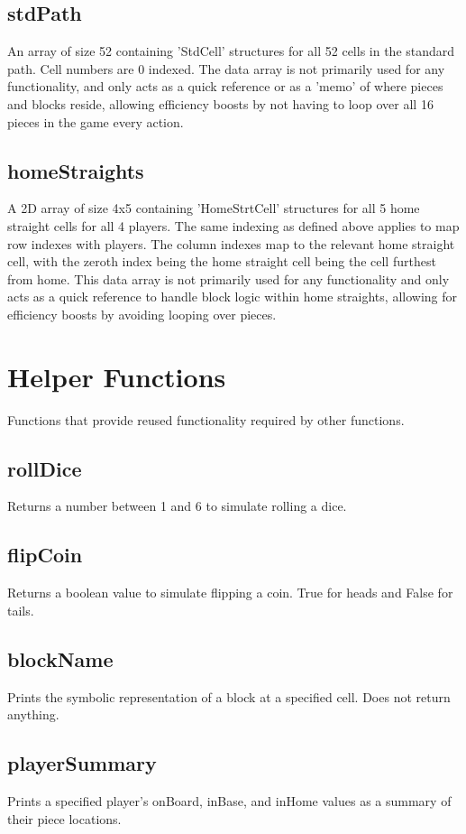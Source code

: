 \documentclass{article}
\begin{document}
\subsection{stdPath}
An array of size 52 containing 'StdCell' structures for all 52 cells in the standard path. Cell numbers are 0 indexed. The data array is not primarily used for any functionality, and only acts as a quick reference or as a 'memo' of where pieces and blocks reside, allowing efficiency boosts by not having to loop over all 16 pieces in the game every action.

\subsection{homeStraights}
A 2D array of size 4x5 containing 'HomeStrtCell' structures for all 5 home straight cells for all 4 players. The same indexing as defined above applies to map row indexes with players. The column indexes map to the relevant home straight cell, with the zeroth index being the home straight cell being the cell furthest from home. This data array is not primarily used for any functionality and only acts as a quick reference to handle block logic within home straights, allowing for efficiency boosts by avoiding looping over pieces.

\section{Helper Functions}
Functions that provide reused functionality required by other functions.
\subsection{rollDice}
Returns a number between 1 and 6 to simulate rolling a dice.

\subsection{flipCoin}
Returns a boolean value to simulate flipping a coin. True for heads and False for tails.

\subsection{blockName}
Prints the symbolic representation of a block at a specified cell. Does not return anything.

\subsection{playerSummary}
Prints a specified player's onBoard, inBase, and inHome values as a summary of their piece locations.
\end{document}
